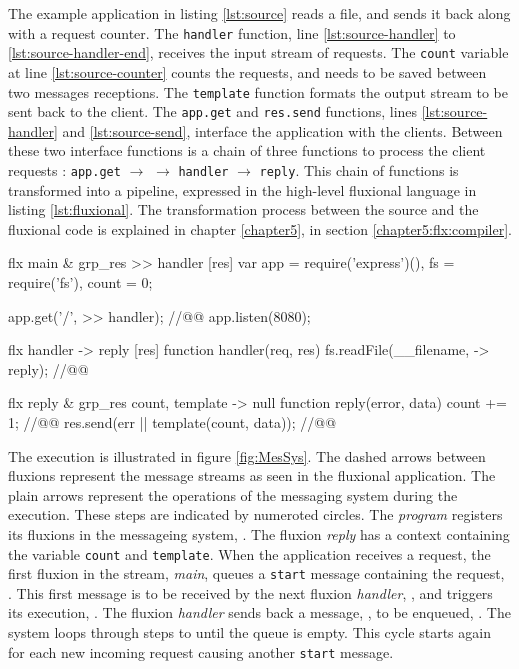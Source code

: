 The example application in listing \ref{lst:source} reads a file, and sends it back along with a request counter.
The \texttt{handler} function, line \ref{lst:source-handler} to \ref{lst:source-handler-end}, receives the input stream of requests.
The \texttt{count} variable at line \ref{lst:source-counter} counts the requests, and needs to be saved between two messages receptions.
The \texttt{template} function formats the output stream to be sent back to the client.
The \texttt{app.get} and \texttt{res.send} functions, lines \ref{lst:source-handler} and \ref{lst:source-send}, interface the application with the clients.
Between these two interface functions is a chain of three functions to process the client requests : \texttt{app.get} $\to$ \hspace{-1.4em} $\to$ \texttt{handler} $\to$ \texttt{reply}.
This chain of functions is transformed into a pipeline, expressed in the high-level fluxional language in listing \ref{lst:fluxional}.
The transformation process between the source and the fluxional code is explained in chapter \ref{chapter5}, in section \ref{chapter5:flx:compiler}.

\begin{code}[flx, caption={Example application expressed in the high-level fluxional language}, label={lst:fluxional}]
flx main & grp_res
>> handler [res]
  var app = require('express')(),
      fs = require('fs'),
      count = 0;

  app.get('/', >> handler); //@\label{lst:fluxional-streamtohandler}@
  app.listen(8080);

flx handler
-> reply [res]
  function handler(req, res) {
    fs.readFile(__filename, -> reply); //@\label{lst:fluxional-readfile}@
  }

flx reply & grp_res {count, template}
-> null
  function reply(error, data) {
    count += 1; //@\label{lst:fluxional-counter}@
    res.send(err || template(count, data)); //@\label{lst:fluxional-ressend}@
  }
\end{code}

The execution is illustrated in figure \ref{fig:MesSys}.
The dashed arrows between fluxions represent the message streams as seen in the fluxional application.
The plain arrows represent the operations of the messaging system during the execution.
These steps are indicated by numeroted circles.
The \textit{program} registers its fluxions in the messageing system, .
The fluxion \textit{reply} has a context containing the variable \texttt{count} and \texttt{tem\-plate}.
When the application receives a request, the first fluxion in the stream, \textit{main}, queues a \texttt{start} message containing the request, .
This first message is to be received by the next fluxion \textit{handler}, , and triggers its execution, .
The fluxion \textit{handler} sends back a message, , to be enqueued, .
The system loops through steps  to  until the queue is empty.
This cycle starts again for each new incoming request causing another \texttt{start} message.

